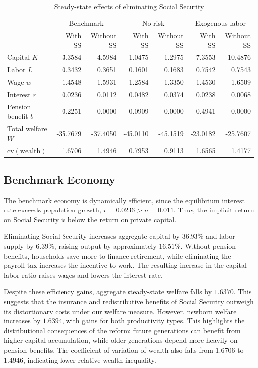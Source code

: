 \documentclass{article}
\begin{document}
\begin{table}[htbp]
    \centering
    \scriptsize
    \setlength{\tabcolsep}{4pt}
    \caption{Steady-state effects of eliminating Social Security}
    \label{tab:ss_results}
    \begin{tabular}{lrrrrrr}
    \hline\hline
     & \multicolumn{2}{c}{Benchmark}
     & \multicolumn{2}{c}{No risk}
     & \multicolumn{2}{c}{Exogenous labor} \\
     & With SS & Without SS
     & With SS & Without SS
     & With SS & Without SS \\
    \hline
    Capital $K$
     & 3.3584 & 4.5984 & 1.0475 & 1.2975 & 7.3553 & 10.4876 \\
    Labor $L$
     & 0.3432 & 0.3651 & 0.1601 & 0.1683 & 0.7542 & 0.7543 \\
    Wage $w$
     & 1.4548 & 1.5931 & 1.2584 & 1.3350 & 1.4530 & 1.6509 \\
    Interest $r$
     & 0.0236 & 0.0112 & 0.0482 & 0.0374 & 0.0238 & 0.0068 \\
    Pension benefit $b$
     & 0.2251 & 0.0000 & 0.0909 & 0.0000 & 0.4941 & 0.0000 \\
    Total welfare $W$
     & -35.7679 & -37.4050 & -45.0110 & -45.1519 & -23.0182 & -25.7607 \\
    $\mathrm{cv}(\mathrm{wealth})$
     & 1.6706 & 1.4946 & 0.7953 & 0.9113 & 1.6565 & 1.4177 \\
    \hline\hline
    \end{tabular}
\end{table}

\subsection*{Benchmark Economy}

The benchmark economy is dynamically efficient, since the equilibrium
interest rate exceeds population growth, $r=0.0236>n=0.011$.
Thus, the implicit return on Social Security is below the return
on private capital.

Eliminating Social Security increases aggregate capital by $36.93\%$
and labor supply by $6.39\%$, raising output by approximately
$16.51\%$. Without pension benefits, households save more to
finance retirement, while eliminating the payroll tax increases
the incentive to work. The resulting increase in the capital-labor
ratio raises wages and lowers the interest rate.

Despite these efficiency gains, aggregate steady-state welfare
falls by $1.6370$. This suggests that the insurance and
redistributive benefits of Social Security outweigh its
distortionary costs under our welfare measure. However, newborn
welfare increases by $1.6394$, with gains for both productivity
types. This highlights the distributional consequences of the
reform: future generations can benefit from higher capital
accumulation, while older generations depend more heavily on
pension benefits. The coefficient of variation of wealth also
falls from $1.6706$ to $1.4946$, indicating lower relative
wealth inequality.
\end{document}
